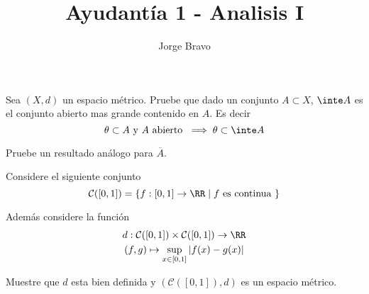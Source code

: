 \documentclass[a4paper,oneside,10.5pt]{USMArt}
\title{Ayudantía 1 - Analisis I}
\author{Jorge Bravo}
\begin{document}
\maketitle

\begin{prob}
  Sea $(X, d)$ un espacio métrico. Pruebe que dado un conjunto $A \subset X$, $\inte A$ es el conjunto abierto mas grande contenido en $A$. Es decir
  \begin{equation*}
    \theta \subset A \text{ y } A \text{ abierto } \implies \theta \subset \inte A
  \end{equation*}

  Pruebe un resultado análogo para $\overline{A}$.
\end{prob}

\begin{comment}
\begin{sol}
  Sea $A \subset X$ y $\theta \subset A$ abierto. Veamos que $\theta \subset \inte A$, sea $x \in \theta$, dado que $\theta$ es abierto, existe $\epsilon > 0$ de tal forma que
  \begin{equation*}
    B(x, \epsilon) \subset \theta \subset A
  \end{equation*}

  Por lo tanto $x \in \inte A$. Es decir $\theta \subset \inte A$.
  \newline

  Sea $A \subset X$ y $A \subset C$ cerrado. Veamos que $\overline{A} \subset C$. Sea $x \in \overline{A}$, luego dado $\epsilon > 0$, sabemos que $A \cap B(x, \epsilon) \neq \emptyset \implies C \cap B(x, \epsilon)$. Por lo tanto $x \in \overline{C}$, dado que $C$ es cerrado tenemos que $C = \overline{C}$ y luego $x \in C$.
  Es decir $\overline{A} \subset C$
\end{sol}
\end{comment}

\begin{prob}
  Considere el siguiente conjunto
  \begin{equation*}
    \mathcal{C}([0, 1]) = \{f : [0, 1] \to \RR \; | \; f \text{ es continua }\}
  \end{equation*}

  Además considere la función
  \begin{gather*}
    d : \mathcal{C}([0, 1]) \times \mathcal{C}([0, 1]) \to \RR\\
    (f, g) \mapsto \sup_{x \in [0, 1]} |f(x) - g(x)|
  \end{gather*}

  Muestre que $d$ esta bien definida y $(\mathcal{C}([0, 1]), d)$ es un espacio métrico.
\end{prob}
\end{document}
